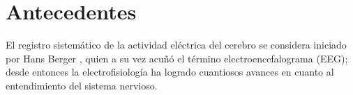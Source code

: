 \chapter{Antecedentes}











El registro sistem\'atico de la actividad el\'ectrica del cerebro se considera 
iniciado por Hans Berger \cite{Berger29}, quien a su vez acu\~n\'o el t\'ermino 
electroencefalograma (EEG); desde entonces la electrofisiolog\'ia 
ha logrado cuantiosos avances en cuanto al entendimiento del sistema nervioso.

